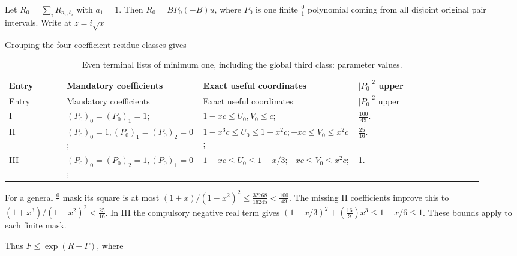 Let \(R_0=\sum_i R_{a_i,\allowbreak \allowbreak b_i}\) with \(a_{1}=1\). Then \(R_0=BP_{0}(-B)u\), where \(P_0\) is one finite \(\frac{0}{1}\) polynomial coming from all disjoint original pair intervals. Write at \(z=i \sqrt{x}\)


Grouping the four coefficient residue classes gives


\begingroup\small
\setlength{\tabcolsep}{3pt}
\setlength{\LTleft}{0pt}\setlength{\LTright}{\fill}
\begin{longtable}{@{}p{0.1200\linewidth}p{0.2667\linewidth}p{0.2667\linewidth}p{0.2667\linewidth}@{}}
\caption{Even terminal lists of minimum one, including the global third class: parameter values.}\label{tab:parameters:r2-c028:2}\\
\toprule
Entry & Mandatory coefficients & Exact useful coordinates & \(\lvert P_0\rvert ^2\) upper \\
\midrule\endfirsthead
\toprule
Entry & Mandatory coefficients & Exact useful coordinates & \(\lvert P_0\rvert ^2\) upper \\
\midrule\endhead
\bottomrule\endfoot
I & \((P_0)_0=(P_0)_1=1\); & \(1-xc\le U_0,\allowbreak \allowbreak V_0\le c\); & \(\frac{100}{49}\). \\
\addlinespace[2pt]
II & \((P_0)_0=1,\allowbreak \allowbreak (P_0)_1=(P_0)_2=0\); & \(1-x^3c\le U_0\le 1+x^2c; -xc\le V_0\le x^2c\); & \(\frac{25}{16}\). \\
\addlinespace[2pt]
III & \((P_0)_0=(P_0)_2=1,\allowbreak \allowbreak (P_0)_1=0\); & \(1-xc\le U_0\le 1-x/3; -xc\le V_0\le x^2c\); & 1. \\
\end{longtable}
\endgroup


For a general \(\frac{0}{1}\) mask its square is at most \((1+x)/(1-x^2)^2\le \frac{32768}{16245} <\frac{100}{49}\). The missing II coefficients improve this to \((1+x^3)/(1-x^2)^2<\frac{25}{16}\). In III the compulsory negative real term gives \((1-x/3)^2+(\frac{16}{9})x^3\le 1-x/6\le 1\). These bounds apply to each finite mask.

Thus \(F\le \exp(R-\Gamma)\), where


